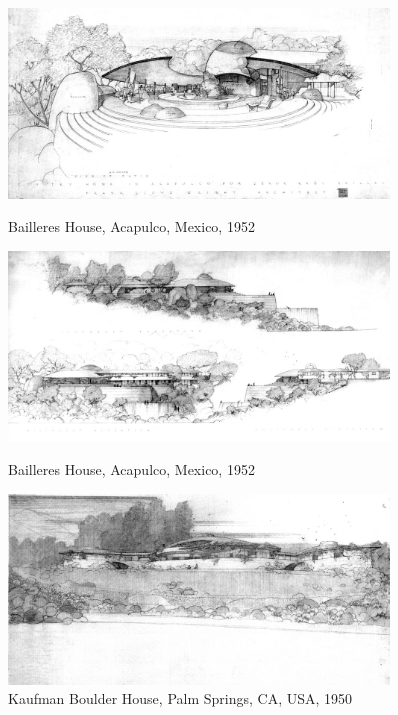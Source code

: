 \documentclass[11pt,article,oneside]{memoir}
\begin{document}
\begin{figure}
\begin{center}
%
\includegraphics[width=0.9\textwidth]{../images/bailleres_1_greyscale.jpg}
\caption{Bailleres House, Acapulco, Mexico, 1952}
%
\includegraphics[width=0.9\textwidth]{../images/bailleres_2_greyscale.jpg}
\caption{Bailleres House, Acapulco, Mexico, 1952}
%
\includegraphics[width=0.9\textwidth]{../images/boulder_greyscale.jpg}
\caption{Kaufman Boulder House, Palm Springs, CA, USA, 1950}
%
%
%
\label{fig:unbuilt_houses}
\end{center}
\end{figure}
\end{document}
